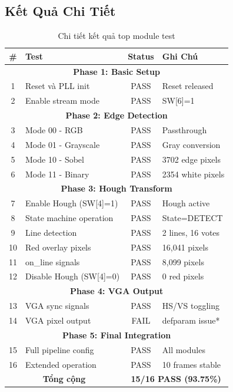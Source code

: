 \documentclass[12pt,a4paper]{article}
\begin{document}
\subsection{Kết Quả Chi Tiết}
\begin{table}[h]
\centering
\small
\begin{tabular}{|c|l|c|l|}
\hline
\textbf{\#} & \textbf{Test} & \textbf{Status} & \textbf{Ghi Chú} \\
\hline
\multicolumn{4}{|c|}{\textbf{Phase 1: Basic Setup}} \\
\hline
1 & Reset và PLL init & \cellcolor{passgreen!30}PASS & Reset released \\
2 & Enable stream mode & \cellcolor{passgreen!30}PASS & SW[6]=1 \\
\hline
\multicolumn{4}{|c|}{\textbf{Phase 2: Edge Detection}} \\
\hline
3 & Mode 00 - RGB & \cellcolor{passgreen!30}PASS & Passthrough \\
4 & Mode 01 - Grayscale & \cellcolor{passgreen!30}PASS & Gray conversion \\
5 & Mode 10 - Sobel & \cellcolor{passgreen!30}PASS & 3702 edge pixels \\
6 & Mode 11 - Binary & \cellcolor{passgreen!30}PASS & 2354 white pixels \\
\hline
\multicolumn{4}{|c|}{\textbf{Phase 3: Hough Transform}} \\
\hline
7 & Enable Hough (SW[4]=1) & \cellcolor{passgreen!30}PASS & Hough active \\
8 & State machine operation & \cellcolor{passgreen!30}PASS & State=DETECT \\
9 & Line detection & \cellcolor{passgreen!30}PASS & 2 lines, 16 votes \\
10 & Red overlay pixels & \cellcolor{passgreen!30}PASS & 16,041 pixels \\
11 & on\_line signals & \cellcolor{passgreen!30}PASS & 8,099 pixels \\
12 & Disable Hough (SW[4]=0) & \cellcolor{passgreen!30}PASS & 0 red pixels \\
\hline
\multicolumn{4}{|c|}{\textbf{Phase 4: VGA Output}} \\
\hline
13 & VGA sync signals & \cellcolor{passgreen!30}PASS & HS/VS toggling \\
14 & VGA pixel output & \cellcolor{failred!30}FAIL & defparam issue* \\
\hline
\multicolumn{4}{|c|}{\textbf{Phase 5: Final Integration}} \\
\hline
15 & Full pipeline config & \cellcolor{passgreen!30}PASS & All modules \\
16 & Extended operation & \cellcolor{passgreen!30}PASS & 10 frames stable \\
\hline
\multicolumn{2}{|c|}{\textbf{Tổng cộng}} & \multicolumn{2}{c|}{\textbf{15/16 PASS (93.75\%)}} \\
\hline
\end{tabular}
\caption{Chi tiết kết quả top module test}
\end{table}
\end{document}

